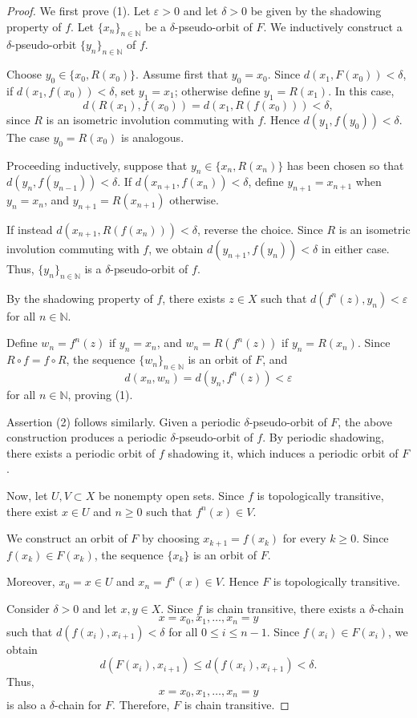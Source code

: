 \documentclass[10pt,a4paper]{amsart}
\begin{document}
\begin{proof}

We first prove (1). Let $\varepsilon>0$ and let $\delta>0$ be given by the shadowing property of $f$. Let $
\{x_n\}_{n\in\mathbb N}$ be a $\delta$-pseudo-orbit of $F$. We inductively construct a $\delta$-pseudo-orbit $
\{y_n\}_{n\in\mathbb N}$ of $f$.

Choose $y_0\in\{x_0,R(x_0)\}$. Assume first that $y_0=x_0$. Since $d(x_1,F(x_0))<\delta$, if $d(x_1,f(x_0))<\delta$, set $y_1=x_1$; otherwise define $
y_1=R(x_1)$. In this case,
\[
d(R(x_1),f(x_0))
=
d(x_1,R(f(x_0)))
<
\delta,
\]
since $R$ is an isometric involution commuting with $f$. Hence
$d(y_1,f(y_0))<\delta$. The case $y_0=R(x_0)$ is analogous.

Proceeding inductively, suppose that $y_n\in\{x_n,R(x_n)\}$ has been chosen so that $d(y_n,f(y_{n-1}))<\delta$. If $d(x_{n+1},f(x_n))<\delta$, define
$y_{n+1}=x_{n+1}$ when $y_n=x_n$, and $y_{n+1}=R(x_{n+1})$ otherwise. 

If instead $d(x_{n+1},R(f(x_n)))<\delta$, reverse the choice. Since $R$ is an isometric involution commuting with $f$, we obtain $d(y_{n+1},f(y_n))<\delta$ in either case. Thus, $\{y_n\}_{n\in\mathbb N}$ is a $\delta$-pseudo-orbit of $f$.

By the shadowing property of $f$, there exists $z\in X$ such that $
d(f^n(z),y_n)<\varepsilon$ for all $n\in\mathbb N$. 

Define $w_n=f^n(z)$ if $y_n=x_n$, and $w_n=R(f^n(z))$ if $y_n=R(x_n)$. Since
$R\circ f=f\circ R$, the sequence $\{w_n\}_{n\in\mathbb N}$ is an orbit of $F$, and 
\[
d(x_n,w_n)
=
d(y_n,f^n(z))
<
\varepsilon
\]
for all $n\in\mathbb N$, proving (1).

Assertion (2) follows similarly. Given a periodic $\delta$-pseudo-orbit of $F$, the above construction produces a periodic $\delta$-pseudo-orbit of $f$. By periodic shadowing, there exists a periodic orbit of $f$ shadowing it, which induces a periodic orbit of $F$.

Now, let $U,V\subset X$ be nonempty open sets. Since $f$ is topologically transitive, there exist $x\in U$ and $n\geq 0$ such that $f^n(x)\in V$.

We construct an orbit of $F$ by choosing $x_{k+1}=f(x_k)$ for every $k\geq 0$. Since $f(x_k)\in F(x_k)$, the sequence $\{x_k\}$ is an orbit of $F$.

Moreover, $x_0=x\in U$ and $x_n=f^n(x)\in V$. Hence $F$ is topologically transitive.

Consider $\delta>0$ and let $x,y\in X$. Since $f$ is chain transitive, there exists a $\delta$-chain
\[
x=x_0,x_1,\ldots,x_n=y
\]
such that $d(f(x_i),x_{i+1})<\delta$ for all $0\leq i\leq n-1$. Since $f(x_i)\in F(x_i)$, we obtain
\[
d(F(x_i),x_{i+1})
\leq d(f(x_i),x_{i+1})
<\delta.
\]
Thus,
\[
x=x_0,x_1,\ldots,x_n=y
\]
is also a $\delta$-chain for $F$. Therefore, $F$ is chain transitive.
\end{proof}
\end{document}
